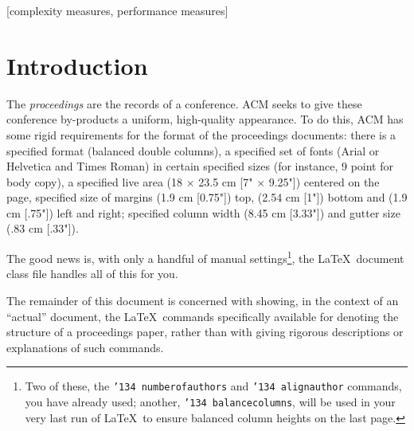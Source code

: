 \documentclass{acm_proc_article-sp}
\begin{document}
[complexity measures, performance measures]



\section{Introduction}
The \textit{proceedings} are the records of a conference.
ACM seeks to give these conference by-products a uniform,
high-quality appearance.  To do this, ACM has some rigid
requirements for the format of the proceedings documents: there
is a specified format (balanced  double columns), a specified
set of fonts (Arial or Helvetica and Times Roman) in
certain specified sizes (for instance, 9 point for body copy),
a specified live area (18 $\times$ 23.5 cm [7" $\times$ 9.25"]) centered on
the page, specified size of margins (1.9 cm [0.75"]) top, (2.54 cm [1"]) bottom
and (1.9 cm [.75"]) left and right; specified column width
(8.45 cm [3.33"]) and gutter size (.83 cm [.33"]).

The good news is, with only a handful of manual
settings\footnote{Two of these, the {\texttt{\char'134 numberofauthors}}
and {\texttt{\char'134 alignauthor}} commands, you have
already used; another, {\texttt{\char'134 balancecolumns}}, will
be used in your very last run of \LaTeX\ to ensure
balanced column heights on the last page.}, the \LaTeX\ document
class file handles all of this for you.

The remainder of this document is concerned with showing, in
the context of an ``actual'' document, the \LaTeX\ commands
specifically available for denoting the structure of a
proceedings paper, rather than with giving rigorous descriptions
or explanations of such commands.
\end{document}
